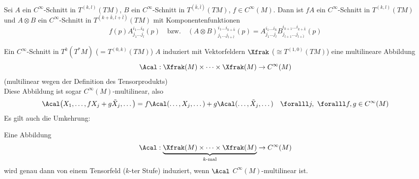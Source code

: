 \begin{lem}
	Sei $ A $ ein $C^\infty$-Schnitt in $T^{(k,l)}(TM)$, $B$ ein $C^\infty$-Schnitt in $T^{\left(\bar{k},\bar{l}\right)}(TM)$, $f \in C^\infty(M)$. Dann ist $ fA $ ein $C^\infty$-Schnitt in $T^{(k,l)}(TM)$ und $ A \otimes B $ ein $C^\infty$-Schnitt in $T^{\left(k + \bar{k},l + \bar{l}\right)}(TM)$ mit Komponentenfunktionen
	\[ f(p)A_{j_1\dots j_l}^{i_1\dots i_k}(p) \quad \text{bzw.} \quad
	(A \otimes B)_{j_1\dots j_{l+\bar{l}}}^{i_1\dots i_{k+\bar{k}}}(p) = A_{j_1\dots j_l}^{i_1\dots i_k} B_{j_{l+1}\dots j_{l+\hat{l}}}^{i_{k+1}\dots i_{k+\hat{k}}}(p) \]
\end{lem}

\begin{rem*}
	Ein $C^\infty$-Schnitt in $T^k(T^*M)$ ($ = T^{(0,k)}(TM) $) $A$ induziert mit Vektorfeldern $\Xfrak$ ($\cong T^{(1,0)}(TM)$) eine multilineare Abbildung
	\[ \Acal: \Xfrak(M) \times \dots \times \Xfrak(M) \to C^\infty(M) \]
	(multilinear wegen der Definition des Tensorprodukts)\\
	Diese Abbildung ist sogar $C^\infty (M)$-multilinear, also
	\[ \Acal \big( X_1,\dotsc, fX_j + g\tilde{X}_j,\dotsc \big) = f\Acal (\dotsc,X_j,\dotsc) + g\Acal(\dotsc,\tilde{X}_j,\dotsc) \quad \foralll j,\ \foralll f,g \in C^\infty(M) \]
	Es gilt auch die Umkehrung:
\end{rem*}

\begin{lem}
	Eine Abbildung 
	\[ \Acal: \underbrace{\Xfrak(M) \times \dots \times \Xfrak(M)}_{k\text{-mal}} \to C^\infty(M) \]
	wird genau dann von einem Tensorfeld ($k$-ter Stufe) induziert, wenn $\Acal$ $C^\infty(M)$-multilinear ist.
\end{lem}

